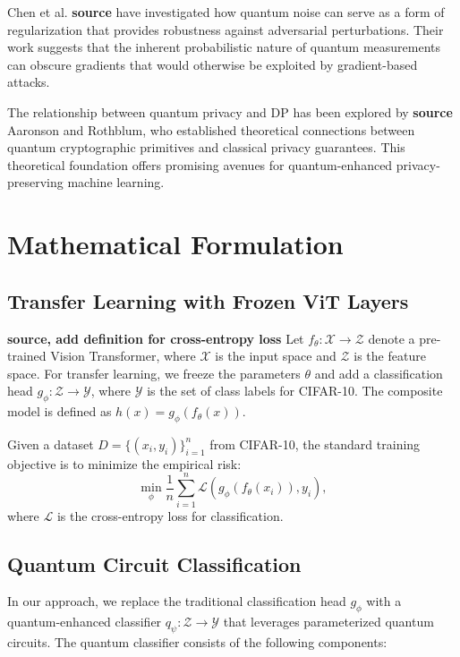 \documentclass[11pt, conference]{IEEEtran}
\begin{document}
Chen et al. \textbf{source} have investigated how quantum noise can serve as a form of regularization that provides robustness against adversarial perturbations. Their work suggests that the inherent probabilistic nature of quantum measurements can obscure gradients that would otherwise be exploited by gradient-based attacks.

The relationship between quantum privacy and DP has been explored by \textbf{source} Aaronson and Rothblum, who established theoretical connections between quantum cryptographic primitives and classical privacy guarantees. This theoretical foundation offers promising avenues for quantum-enhanced privacy-preserving machine learning.


\section{Mathematical Formulation}

\subsection{Transfer Learning with Frozen ViT Layers} 
\textbf{source, add definition for cross-entropy loss}
Let $f_{\theta}: \mathcal{X} \rightarrow \mathcal{Z}$ denote a pre-trained Vision Transformer, where $\mathcal{X}$ is the input space and $\mathcal{Z}$ is the feature space. For transfer learning, we freeze the parameters $\theta$ and add a classification head $g_{\phi}: \mathcal{Z} \rightarrow \mathcal{Y}$, where $\mathcal{Y}$ is the set of class labels for CIFAR-10. The composite model is defined as $h(x) = g_{\phi}(f_{\theta}(x)).$

Given a dataset $D = \{(x_i, y_i)\}_{i=1}^n$ from CIFAR-10, the standard training objective is to minimize the empirical risk:
\begin{equation}
\min_{\phi} \frac{1}{n} \sum_{i=1}^{n} \mathcal{L}(g_{\phi}(f_{\theta}(x_i)), y_i),
\end{equation}
where $\mathcal{L}$ is  the cross-entropy loss for classification.

\subsection{Quantum Circuit Classification}
In our approach, we replace the traditional classification head \( g_{\phi} \) with a quantum-enhanced classifier \( q_{\psi}: \mathcal{Z} \to \mathcal{Y} \) that leverages parameterized quantum circuits. The quantum classifier consists of the following components:
\end{document}
